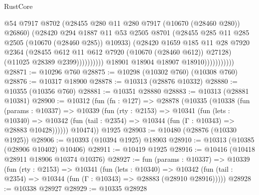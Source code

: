 \begin{lexlean}{RustCore}
\begin{coremodule}
                                        @54
                                        @7917
                                        @8702
                                        (@28455 @280 @11 @280 @7917 (@10670 (@28460 @280)) @26860)
                                        (@28420
                                          @294
                                          @1887
                                          @11
                                          @53
                                          @2505
                                          @8701
                                          (@28455 @285 @11 @285 @2505 (@10670 (@28460 @285)) @10933)
                                          (@28420
                                            @1659
                                            @185
                                            @11
                                            @28
                                            @7920
                                            @2364
                                            (@28455
                                              @612
                                              @11
                                              @612
                                              @7920
                                              (@10670 (@28460 @612))
                                              @27128)
                                            (@11025 @28389 @2399))))))))))
                          @18901
                          @18904
                          @18907
                          @18910)))))))))))
@28871 := @10296 @760
@28875 := @10298 (@10302 @760) (@10308 @760)
@28876 := @10317 @18900
@28878 := @10313 (@28876 @10332)
@28880 := @10355 (@10356 @760)
@28881 := @10351 @28880
@28883 := @10313 (@28881 @10381)
@28900 := @10312
    (fun (fn : @127) =>
    @28878
      (@10335
        (@10338
          (fun (params : @10337) =>
          @10339
            (fun (rty : @2153) =>
            @10341
              (fun (lets : @10340) =>
              @10342 (fun (tail : @2354) => @10344 (fun (Γ : @10343) => @28883 @10428))))))
        @10474))
    @1925
@28903 := @10480 (@28876 (@10330 @1925))
@28906 := @10393 (@10394 @1925) @18903
@28910 := @10313 (@10385 (@28906 @10402) @10406)
@28911 := @10419 @1925
@28916 := @10416 (@10418 @28911 @18906 @10374 @10376)
@28927 := fun (params : @10337) =>
  @10339
    (fun (rty : @2153) =>
    @10341
      (fun (lets : @10340) =>
      @10342 (fun (tail : @2354) => @10344 (fun (Γ : @10343) => @28883 (@28910 @28916)))))
@28928 := @10338 @28927
@28929 := @10335 @28928

\end{coremodule}
\end{lexlean}
